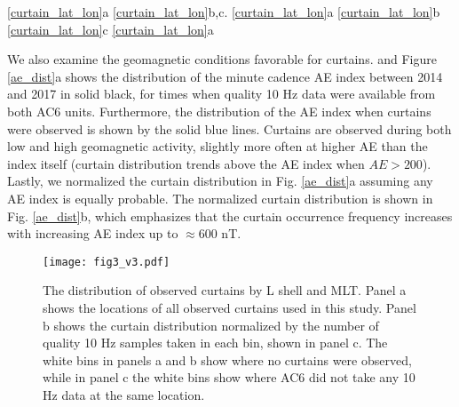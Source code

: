 \documentclass[draft]{agujournal2019}
\begin{document}
 \ref{curtain_lat_lon}a  \ref{curtain_lat_lon}b,c.  \ref{curtain_lat_lon}a  \ref{curtain_lat_lon}b  \ref{curtain_lat_lon}c  \ref{curtain_lat_lon}a 

We also examine the geomagnetic conditions favorable for curtains.   and   Figure \ref{ae_dist}a shows the distribution of the minute cadence AE index between 2014 and 2017 in solid black, for times when quality 10 Hz data were available from both AC6 units. Furthermore, the distribution of the AE index when curtains were observed is shown by the solid blue lines. Curtains are observed during both low and high geomagnetic activity, slightly more often at higher AE than the index itself (curtain distribution trends above the AE index when $AE > 200$). Lastly, we normalized the curtain distribution in Fig. \ref{ae_dist}a assuming any AE index is equally probable. The normalized curtain distribution is shown in Fig. \ref{ae_dist}b, which emphasizes that the curtain occurrence frequency increases with increasing AE index up to $\approx 600$ nT.

\begin{figure}
\texttt{[image: fig3\_v3.pdf]}
\caption{The distribution of observed curtains by L shell and MLT. Panel a shows the locations of all observed curtains used in this study. Panel b shows the curtain distribution normalized by the number of quality 10 Hz samples taken in each bin, shown in panel c. The white bins in panels a and b show where no curtains were observed, while in panel c the white bins show where AC6 did not take any 10 Hz data at the same location.}
\label{l_mlt_dist}
\end{figure}
\end{document}
